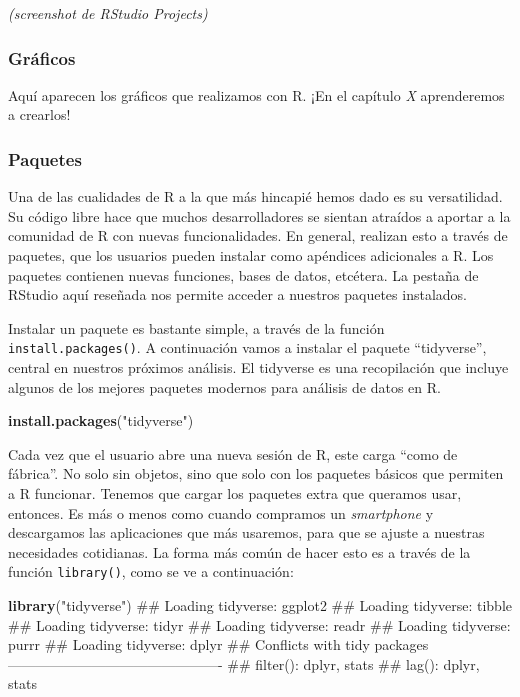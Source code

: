\documentclass[]{book}
\newenvironment{Shaded}{\begin{snugshade}}{\end{snugshade}}
\newcommand{\KeywordTok}[1]{\textcolor[rgb]{0.13,0.29,0.53}{\textbf{#1}}}
\newcommand{\StringTok}[1]{\textcolor[rgb]{0.31,0.60,0.02}{#1}}
\newcommand{\NormalTok}[1]{#1}
\begin{document}
\emph{(screenshot de RStudio Projects)}

\subsubsection{Gráficos}\label{graficos}

Aquí aparecen los gráficos que realizamos con R. ¡En el capítulo
\emph{X} aprenderemos a crearlos!

\subsubsection{Paquetes}\label{paquetes}

Una de las cualidades de R a la que más hincapié hemos dado es su
versatilidad. Su código libre hace que muchos desarrolladores se sientan
atraídos a aportar a la comunidad de R con nuevas funcionalidades. En
general, realizan esto a través de paquetes, que los usuarios pueden
instalar como apéndices adicionales a R. Los paquetes contienen nuevas
funciones, bases de datos, etcétera. La pestaña de RStudio aquí reseñada
nos permite acceder a nuestros paquetes instalados.

Instalar un paquete es bastante simple, a través de la función
\texttt{install.packages()}. A continuación vamos a instalar el paquete
``tidyverse'', central en nuestros próximos análisis. El tidyverse es
una recopilación que incluye algunos de los mejores paquetes modernos
para análisis de datos en R.

\begin{Shaded}
\begin{Highlighting}[]
\KeywordTok{install.packages}\NormalTok{(}\StringTok{"tidyverse"}\NormalTok{)}
\end{Highlighting}
\end{Shaded}

Cada vez que el usuario abre una nueva sesión de R, este carga ``como de
fábrica''. No solo sin objetos, sino que solo con los paquetes básicos
que permiten a R funcionar. Tenemos que cargar los paquetes extra que
queramos usar, entonces. Es más o menos como cuando compramos un
\emph{smartphone} y descargamos las aplicaciones que más usaremos, para
que se ajuste a nuestras necesidades cotidianas. La forma más común de
hacer esto es a través de la función \texttt{library()}, como se ve a
continuación:

\begin{Shaded}
\begin{Highlighting}[]
\KeywordTok{library}\NormalTok{(}\StringTok{"tidyverse"}\NormalTok{)}
\NormalTok{## Loading tidyverse: ggplot2}
\NormalTok{## Loading tidyverse: tibble}
\NormalTok{## Loading tidyverse: tidyr}
\NormalTok{## Loading tidyverse: readr}
\NormalTok{## Loading tidyverse: purrr}
\NormalTok{## Loading tidyverse: dplyr}
\NormalTok{## Conflicts with tidy packages ----------------------------------------------}
\NormalTok{## filter(): dplyr, stats}
\NormalTok{## lag():    dplyr, stats}
\end{Highlighting}
\end{Shaded}
\end{document}

